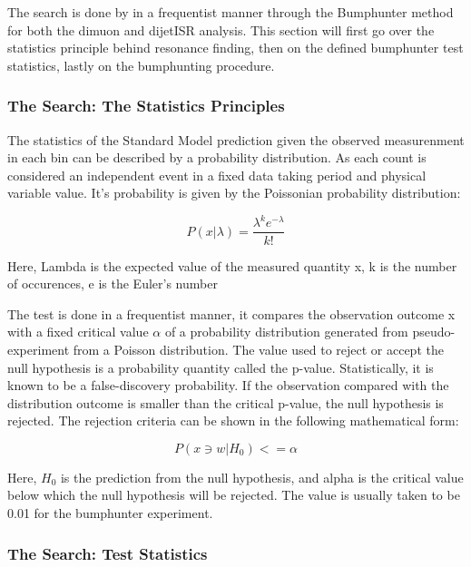 The search is done by in a frequentist manner through the Bumphunter method~\cite{choudalakis2011hypothesis} for both the dimuon and dijetISR analysis. This section will first go over the statistics principle behind resonance finding, then on the defined bumphunter test statistics, lastly on the bumphunting procedure. 





\subsubsection{The Search: The Statistics Principles}

The statistics of the Standard Model prediction given the observed measurenment in each bin can be described by a probability distribution. As each count is considered an independent event in a fixed data taking period and physical variable value. It's probability is given by the Poissonian probability distribution:

\begin{equation}
 P(x|\lambda) = \frac{\lambda^{k}e^{-\lambda}}{k!} 
 \label{eq:Poissonian}
\end{equation}

Here, Lambda is the expected value of the measured quantity x, k is the number of occurences, e is the Euler's number  

    The test is done in a frequentist manner, it compares the observation outcome x with a fixed critical value $\alpha$ of a probability distribution generated from pseudo-experiment from a Poisson distribution. The value used to reject or accept the null hypothesis is a probability quantity called the p-value. Statistically, it is known to be a false-discovery probability. 
    If the observation compared with the distribution outcome is smaller than the critical p-value, the null hypothesis is rejected. The rejection criteria can be shown in the following mathematical form:

\begin{equation}
    P(x \ni w|H_0)<= \alpha 
    \label{eq:test}
\end{equation}


Here, $H_0$ is the prediction from the null hypothesis, and alpha is the critical value below which the null hypothesis will be rejected. The value is usually taken to be 0.01 for the bumphunter experiment. 

\subsubsection{The Search: Test Statistics}
\label{teststatistics}

